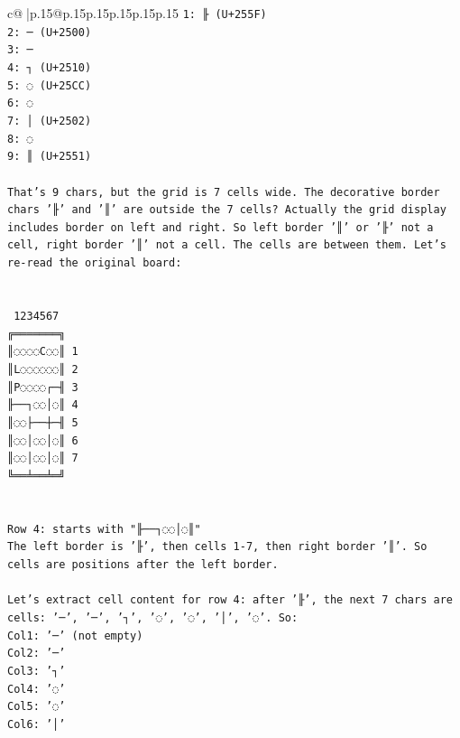 \documentclass{article}
\begin{document}
{\begin{supertabular}{c@{$\;$}|p{.15\linewidth}@{}p{.15\linewidth}p{.15\linewidth}p{.15\linewidth}p{.15\linewidth}p{.15\linewidth}}
{{{\texttt{1: ╟ (U+255F)} \\
\texttt{2: ─ (U+2500)} \\
\texttt{3: ─} \\
\texttt{4: ┐ (U+2510)} \\
\texttt{5: ◌ (U+25CC)} \\
\texttt{6: ◌} \\
\texttt{7: │ (U+2502)} \\
\texttt{8: ◌} \\
\texttt{9: ║ (U+2551)} \\
\\ 
\texttt{That’s 9 chars, but the grid is 7 cells wide. The decorative border chars '╟' and '║' are outside the 7 cells? Actually the grid display includes border on left and right. So left border '║' or '╟' not a cell, right border '║' not a cell. The cells are between them. Let's re{-}read the original board:} \\
\\ 
\\ 
\texttt{ 1234567} \\
\texttt{╔═══════╗} \\
\texttt{║◌◌◌◌C◌◌║ 1} \\
\texttt{║L◌◌◌◌◌◌║ 2} \\
\texttt{║P◌◌◌◌┌─╢ 3} \\
\texttt{╟──┐◌◌│◌║ 4} \\
\texttt{║◌◌├──┼─╢ 5} \\
\texttt{║◌◌│◌◌│◌║ 6} \\
\texttt{║◌◌│◌◌│◌║ 7} \\
\texttt{╚══╧══╧═╝} \\
\\ 
\\ 
\texttt{Row 4: starts with "╟──┐◌◌│◌║"} \\
\texttt{The left border is '╟', then cells 1{-}7, then right border '║'. So cells are positions after the left border.} \\
\\ 
\texttt{Let's extract cell content for row 4: after '╟', the next 7 chars are cells: '─', '─', '┐', '◌', '◌', '│', '◌'. So:} \\
\texttt{Col1: '─' (not empty)} \\
\texttt{Col2: '─'} \\
\texttt{Col3: '┐'} \\
\texttt{Col4: '◌'} \\
\texttt{Col5: '◌'} \\
\texttt{Col6: '│'} \\
}}}
\end{supertabular}}
\end{document}
